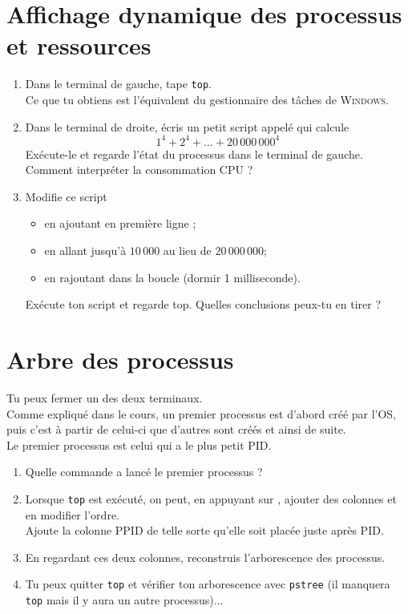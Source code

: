 \documentclass[12pt,a4paper,article,english,firamath]{nsi}
\newcommand{\touche}[1] %
{\tikz[baseline=.2em]{
    \draw[fill=lightgray,rounded corners=2pt] (-.1em,-.1em) rectangle (2.1em,1.1em);
    \draw[fill=white,rounded corners=2pt] (0em,0em) rectangle (2em,1em);
    \draw (1em,.5em) node{\tiny{#1}};
    }}
\begin{document}
\section*{Affichage dynamique des processus et ressources}
\begin{enumerate}
    \item Dans le terminal de gauche, tape \texttt{top}.\\
          Ce que tu obtiens est l'équivalent du gestionnaire des tâches de \textsc{Windows}.\\
          
    \item Dans le terminal de droite, écris un petit script appelé  qui calcule
          $$1^4+2^4+\ldots+20\,000\,000^4$$
          Exécute-le et regarde l'état du processus dans le terminal de gauche. Comment interpréter la consommation CPU ?\\
          
    \item Modifie ce script
          \begin{itemize}
              \item en ajoutant en première ligne ;
              \item en allant jusqu'à $10\,000$ au lieu de $20\,000\,000$;
              \item en rajoutant dans la boucle  (dormir 1 milliseconde).
          \end{itemize}
          Exécute ton script et regarde top. Quelles conclusions peux-tu en tirer ?
\end{enumerate}
\section*{Arbre des processus}
Tu peux fermer un des deux terminaux.\\

Comme expliqué dans le cours, un premier processus est d'abord créé par l'OS, puis c'est à partir de celui-ci que d'autres sont créés et ainsi de suite.\\
Le premier processus est celui qui a le plus petit PID.\\
\begin{enumerate}
    \item 	Quelle commande a lancé le premier processus ?
    \item 	Lorsque \texttt{top} est exécuté, on peut, en appuyant sur \touche{f} , ajouter des colonnes et en modifier l'ordre.\\
          Ajoute la colonne PPID de telle sorte qu'elle soit placée juste après PID.
    \item 	En regardant ces deux colonnes, reconstruis l'arborescence des processus.
    \item 	Tu peux quitter \texttt{top} et vérifier ton arborescence avec \texttt{pstree} (il manquera \texttt{top} mais il y aura un autre processus)...
\end{enumerate}
\end{document}
